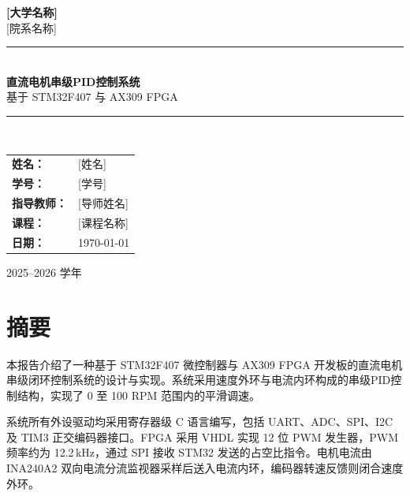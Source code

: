 \documentclass[12pt, a4paper]{ctexrep}
\begin{document}
\begin{titlepage}
    \centering
    \vspace*{2cm}

    {\Large \textbf{[大学名称]}}\\[0.5cm]
    {\large [院系名称]}\\[2cm]

    \rule{\linewidth}{0.5pt}\\[0.5cm]
    {\LARGE \textbf{直流电机串级PID控制系统}}\\[0.3cm]
    {\large 基于 STM32F407 与 AX309 FPGA}\\[0.5cm]
    \rule{\linewidth}{0.5pt}\\[2cm]

    {\large
    \begin{tabular}{ll}
        \textbf{姓名：}     & [姓名] \\[0.3cm]
        \textbf{学号：}     & [学号] \\[0.3cm]
        \textbf{指导教师：} & [导师姓名] \\[0.3cm]
        \textbf{课程：}     & [课程名称] \\[0.3cm]
        \textbf{日期：}     & \today \\
    \end{tabular}
    }

    \vfill
    {\small 2025--2026 学年}
\end{titlepage}

\chapter*{摘要}

本报告介绍了一种基于 STM32F407 微控制器与 AX309 FPGA 开发板的直流电机串级闭环控制系统的设计与实现。系统采用速度外环与电流内环构成的串级PID控制结构，实现了 0 至 100 RPM 范围内的平滑调速。

系统所有外设驱动均采用寄存器级 C 语言编写，包括 UART、ADC、SPI、I2C 及 TIM3 正交编码器接口。FPGA 采用 VHDL 实现 12 位 PWM 发生器，PWM 频率约为 12.2\,kHz，通过 SPI 接收 STM32 发送的占空比指令。电机电流由 INA240A2 双向电流分流监视器采样后送入电流内环，编码器转速反馈则闭合速度外环。
\end{document}
